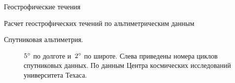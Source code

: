 \begin{chapter}{Геострофические течения}
\begin{section}{Расчет геострофических течений по альтиметрическим данным}
\begin{paragraph}{Спутниковая альтиметрия.}
\begin{figure}[t!]
{${5}^\circ$ по долготе и~${2}^\circ$ по широте. 
Слева приведены номера циклов спутниковых данных. 
По данным Центра космических исследований университета Техаса.}
\label{texas-may01}
\end{figure}
%
%
\end{paragraph}


\end{section}
\end{chapter}
